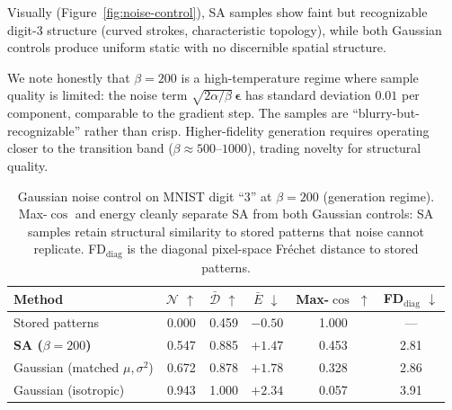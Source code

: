 Visually (Figure~\ref{fig:noise-control}), SA samples show faint but recognizable digit-3 structure (curved strokes, characteristic topology), while both Gaussian controls produce uniform static with no discernible spatial structure.

We note honestly that $\beta{=}200$ is a high-temperature regime where sample quality is limited: the noise term $\sqrt{2\alpha/\beta}\,\boldsymbol{\epsilon}$ has standard deviation $0.01$ per component, comparable to the gradient step. The samples are ``blurry-but-recognizable'' rather than crisp. Higher-fidelity generation requires operating closer to the transition band ($\beta{\approx}500$--$1000$), trading novelty for structural quality.

\begin{table}[h]
\centering
\caption{Gaussian noise control on MNIST digit ``3'' at $\beta{=}200$ (generation regime). Max-$\cos$ and energy cleanly separate SA from both Gaussian controls: SA samples retain structural similarity to stored patterns that noise cannot replicate. FD$_{\text{diag}}$ is the diagonal pixel-space Fr\'{e}chet distance to stored patterns.}
\label{tab:noise-control}
\small
\begin{tabular}{@{}lccccc@{}}
\toprule
Method & $\mathcal{N}$ $\uparrow$ & $\bar{\mathcal{D}}$ $\uparrow$ & $\bar{E}$ $\downarrow$ & Max-$\cos$ $\uparrow$ & FD$_{\text{diag}}$ $\downarrow$ \\
\midrule
Stored patterns                   & 0.000 & 0.459 & $-0.50$ & 1.000 & ---  \\
\textbf{SA ($\beta{=}200$)}       & 0.547 & 0.885 & $+1.47$ & 0.453 & 2.81 \\
Gaussian (matched $\mu,\sigma^2$) & 0.672 & 0.878 & $+1.78$ & 0.328 & 2.86 \\
Gaussian (isotropic)              & 0.943 & 1.000 & $+2.34$ & 0.057 & 3.91 \\
\bottomrule
\end{tabular}
\end{table}

